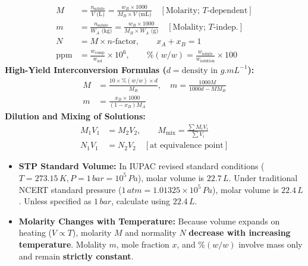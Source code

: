 \documentclass[10pt,twoside,openright]{book}
\begin{document}
\begin{formulabox}
\begin{align}
  M &= \frac{n_{\text{solute}}}{V\text{ (L)}} = \frac{w_B \times 1000}{M_B \times V\text{ (mL)}} \quad [\text{Molarity; } T\text{-dependent}] \\
  m &= \frac{n_{\text{solute}}}{W_A\text{ (kg)}} = \frac{w_B \times 1000}{M_B \times W_A\text{ (g)}} \quad [\text{Molality; } T\text{-indep.}] \\
  N &= M \times n\text{-factor}, \qquad x_A + x_B = 1 \\
  \text{ppm} &= \frac{w_{\text{comp}}}{w_{\text{sol}}} \times 10^6, \qquad \%(w/w) = \frac{w_{\text{solute}}}{w_{\text{solution}}} \times 100
\end{align}
\textbf{High-Yield Interconversion Formulas ($d = \text{density in }\si{g.mL^{-1}}$):}
\begin{align}
  M &= \frac{10 \times \%(w/w) \times d}{M_B}, \quad m = \frac{1000 M}{1000 d - M M_B} \\
  m &= \frac{x_B \times 1000}{(1 - x_B)M_A}
\end{align}
\textbf{Dilution and Mixing of Solutions:}
\begin{align}
  M_1 V_1 &= M_2 V_2, \qquad M_{\text{mix}} = \frac{\sum M_i V_i}{\sum V_i} \\
  N_1 V_1 &= N_2 V_2 \quad [\text{at equivalence point}]
\end{align}
\end{formulabox}

\begin{trapbox}
\begin{itemize}
  \item \textbf{STP Standard Volume:} In IUPAC revised standard conditions ($T = 273.15\,\si{K}, P = 1\,\si{bar} = 10^5\,\si{Pa}$), molar volume is $22.7\,\si{L}$. Under traditional NCERT standard pressure ($1\,\si{atm} = 1.01325\times 10^5\,\si{Pa}$), molar volume is $22.4\,\si{L}$. Unless specified as $1\,\si{bar}$, calculate using $22.4\,\si{L}$.
  \item \textbf{Molarity Changes with Temperature:} Because volume expands on heating ($V \propto T$), molarity $M$ and normality $N$ \textbf{decrease with increasing temperature}. Molality $m$, mole fraction $x$, and $\%(w/w)$ involve mass only and remain \textbf{strictly constant}.
\end{itemize}
\end{trapbox}
\end{document}
